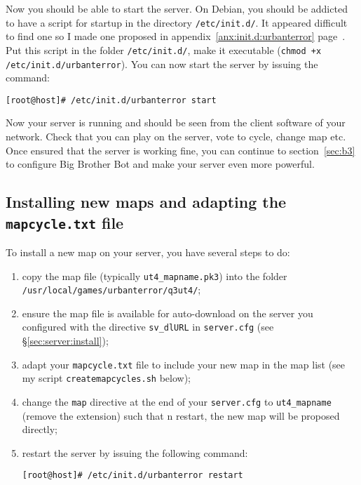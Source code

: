 Now you should be able to start the server. On Debian, you should be addicted to
have a script for startup in the directory \texttt{/etc/init.d/}.
It appeared difficult to find one so I made one proposed in
appendix~\ref{anx:init.d:urbanterror} page~\pageref{anx:init.d:urbanterror}. 
Put this script in the folder \texttt{/etc/init.d/}, make it
executable (\texttt{chmod +x /etc/init.d/urbanterror}). You can now start the
server by issuing the command: 
\begin{lstlisting}[style=command]
[root@host]# /etc/init.d/urbanterror start
\end{lstlisting}

Now your server is running and should be seen from the client software of your
network. Check that you can play on the server, vote to cycle, change map etc. 
Once ensured that the server is working fine, you can continue to
section~\ref{sec:b3} to configure Big Brother Bot and make your server even more  
powerful. 

\subsection{Installing new maps and adapting the \texttt{mapcycle.txt} file}
\label{sec:server:new:map}

To install a new map on your server, you have several steps to do: 
\begin{enumerate}
\item copy the map file (typically \texttt{ut4\_mapname.pk3}) into the folder\\
  \texttt{/usr/local/games/urbanterror/q3ut4/}; 
\item ensure the map file is available for auto-download on the server you
  configured with the directive \texttt{sv\_dlURL} in \texttt{server.cfg} (see
  \S\ref{sec:server:install});
\item adapt your \texttt{mapcycle.txt} file to include your new map in the map
  list (see my script \texttt{createmapcycles.sh} below);
\item change the \texttt{map} directive at the end of your \texttt{server.cfg}
  to  \texttt{ut4\_mapname} (remove the extension) such that n restart, the new
  map will be proposed directly;
\item restart the server by issuing the following command: 
  \begin{lstlisting}[style=command]
    [root@host]# /etc/init.d/urbanterror restart
  \end{lstlisting}
\end{enumerate}

